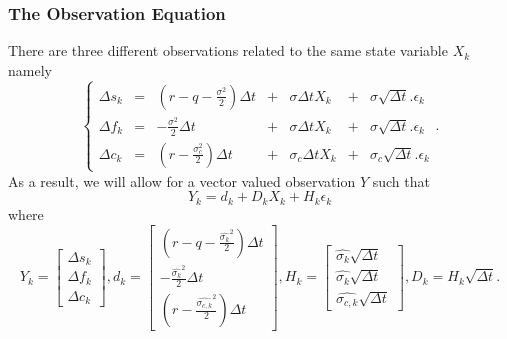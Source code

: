 \documentclass{article}
\theoremstyle{definition}
\theoremstyle{remark}
\begin{document}
\subsubsection{The Observation Equation}
There are three different observations related to the same state variable $X_k$ namely 
\begin{equation}
\left\{ \begin{array}{lcrcrcr}
			\Delta s_{k} & = & (r-q-\frac{\sigma^2}{2}) \Delta t & + & \sigma \Delta t X_k & + & \sigma  \sqrt{\Delta t}.\epsilon_k \\ 
			\Delta f_{k} & = & -\frac{\sigma^2}{2} \Delta t & + & \sigma \Delta t X_k & + & \sigma  \sqrt{\Delta t}.\epsilon_k \\ 
			\Delta c_{k} & = & (r-\frac{\sigma_c^2}{2})\Delta t & + & \sigma_c \Delta t X_k & + & \sigma_c \sqrt{\Delta t}.\epsilon_k 
        \end{array} \right. .
\end{equation}
As a result, we will allow for a vector valued observation $Y$ such that
\begin{equation}
Y_k=d_k+D_kX_k+H_k\epsilon_k
\end{equation}
where
\begin{equation}
Y_k=\begin{bmatrix}
\Delta s_k\\ 
\Delta f_k\\ 
\Delta c_k
\end{bmatrix}, 
d_k=\begin{bmatrix}
(r-q-\frac{\hat{\sigma_k}^2}{2})\Delta t\\ 
-\frac{\hat{\sigma_k}^2}{2}\Delta t\\ 
(r-\frac{\hat{\sigma_{c,k}}^2}{2})\Delta t
\end{bmatrix},
H_k=\begin{bmatrix}
\hat{\sigma_k}\sqrt{\Delta t}\\ 
\hat{\sigma_k}\sqrt{\Delta t}\\ 
\hat{\sigma_{c,k}}\sqrt{\Delta t}
\end{bmatrix},
D_k=H_k\sqrt{\Delta t}.
\end{equation}
\end{document}
